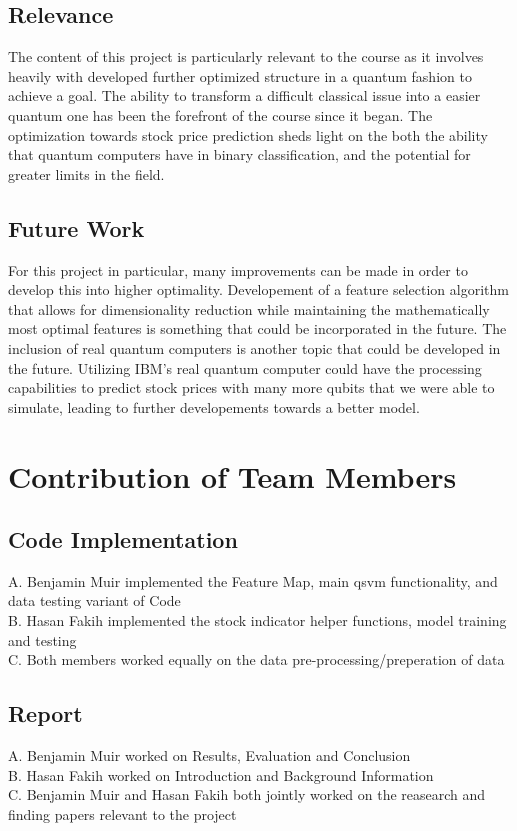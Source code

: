 \documentclass{article}
\begin{document}
\subsection{Relevance}
The content of this project is particularly relevant to the course as it involves heavily with developed further optimized structure in a quantum fashion 
to achieve a goal. The ability to transform a difficult classical issue into a easier quantum one has been the forefront of the course since it began. 
The optimization towards stock price prediction sheds light on the both the ability that quantum computers have in binary classification, and the potential 
for greater limits in the field. 
\subsection{Future Work}
For this project in particular, many improvements can be made in order to develop this into higher optimality. Developement of a 
feature selection algorithm that allows for dimensionality reduction while maintaining the mathematically most optimal features is something 
that could be incorporated in the future. The inclusion of real quantum computers is another topic that could be developed in the future. Utilizing IBM's real quantum computer
could have the processing capabilities to predict stock prices with many more qubits that we were able to simulate, leading to further developements towards a better model. 
\section*{Contribution of Team Members}
\subsection*{Code Implementation}
A. Benjamin Muir implemented the Feature Map, main \gls{qsvm} functionality, and data testing variant of Code
\\
\noindent
B. Hasan Fakih implemented the stock indicator helper functions, model training and testing
\\
\noindent
C. Both members worked equally on the data pre-processing/preperation of data  
\subsection*{Report}
A. Benjamin Muir worked on Results, Evaluation and Conclusion 
\\
\noindent
B. Hasan Fakih worked on Introduction and Background Information
\\
C. Benjamin Muir and Hasan Fakih both jointly worked on the reasearch and finding papers relevant to the project
\end{document}
